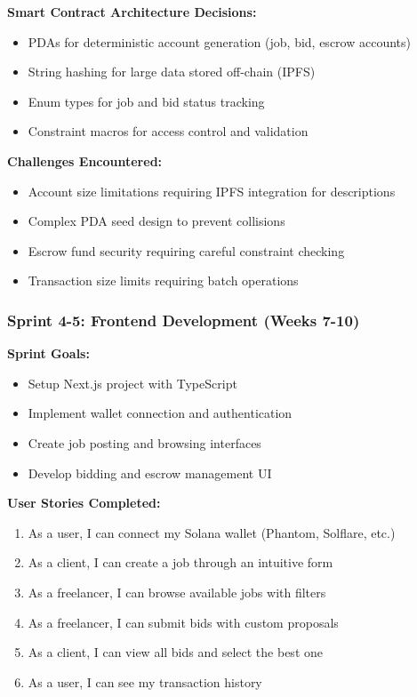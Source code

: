 \documentclass[a4paper,13pt,twoside]{report}
\theoremstyle{definition}
\begin{document}
\textbf{Smart Contract Architecture Decisions:}
\begin{itemize}
    \item PDAs for deterministic account generation (job, bid, escrow accounts)
    \item String hashing for large data stored off-chain (IPFS)
    \item Enum types for job and bid status tracking
    \item Constraint macros for access control and validation
\end{itemize}

\textbf{Challenges Encountered:}
\begin{itemize}
    \item Account size limitations requiring IPFS integration for descriptions
    \item Complex PDA seed design to prevent collisions
    \item Escrow fund security requiring careful constraint checking
    \item Transaction size limits requiring batch operations
\end{itemize}

\subsubsection{Sprint 4-5: Frontend Development (Weeks 7-10)}

\textbf{Sprint Goals:}
\begin{itemize}
    \item Setup Next.js project with TypeScript
    \item Implement wallet connection and authentication
    \item Create job posting and browsing interfaces
    \item Develop bidding and escrow management UI
\end{itemize}

\textbf{User Stories Completed:}
\begin{enumerate}
    \item As a user, I can connect my Solana wallet (Phantom, Solflare, etc.)
    \item As a client, I can create a job through an intuitive form
    \item As a freelancer, I can browse available jobs with filters
    \item As a freelancer, I can submit bids with custom proposals
    \item As a client, I can view all bids and select the best one
    \item As a user, I can see my transaction history
\end{enumerate}
\end{document}
